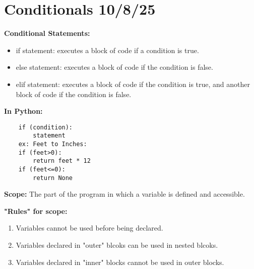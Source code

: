\documentclass[11pt]{article}
\begin{document}
\section{Conditionals 10/8/25}
\textbf{Conditional Statements:}
\begin{itemize}
    \item if statement: executes a block of code if a condition is true.
    \item else statement: executes a block of code if the condition is false.
    \item elif statement: executes a block of code if the condition is true, and another block of code if the condition is false.
\end{itemize}
\textbf{In Python:}
\begin{verbatim}
    if (condition):
        statement
    ex: Feet to Inches:
    if (feet>0):
        return feet * 12
    if (feet<=0):
        return None
\end{verbatim}
\textbf{Scope:} The part of the program in which a variable is defined and accessible. 
\begin{center}
\textbf{"Rules" for scope:}
\end{center}
\begin{enumerate}
    \item Variables cannot be used before being declared.
    \item Variables declared in "outer" blcoks can be used in nested blcoks.
    \item Variables declared in "inner" blocks cannot be used in outer blocks.
\end{enumerate}
\end{document}
